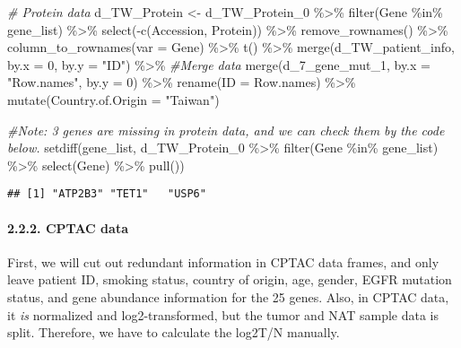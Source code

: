 \documentclass[
]{article}
\newenvironment{Shaded}{\begin{snugshade}}{\end{snugshade}}
\newcommand{\AttributeTok}[1]{\textcolor[rgb]{0.77,0.63,0.00}{#1}}
\newcommand{\CommentTok}[1]{\textcolor[rgb]{0.56,0.35,0.01}{\textit{#1}}}
\newcommand{\DecValTok}[1]{\textcolor[rgb]{0.00,0.00,0.81}{#1}}
\newcommand{\FunctionTok}[1]{\textcolor[rgb]{0.00,0.00,0.00}{#1}}
\newcommand{\NormalTok}[1]{#1}
\newcommand{\OtherTok}[1]{\textcolor[rgb]{0.56,0.35,0.01}{#1}}
\newcommand{\SpecialCharTok}[1]{\textcolor[rgb]{0.00,0.00,0.00}{#1}}
\newcommand{\StringTok}[1]{\textcolor[rgb]{0.31,0.60,0.02}{#1}}
\begin{document}
\begin{Shaded}
\begin{Highlighting}[]
\CommentTok{\# Protein data}
\NormalTok{d\_TW\_Protein }\OtherTok{\textless{}{-}}\NormalTok{ d\_TW\_Protein\_0 }\SpecialCharTok{\%\textgreater{}\%} 
  \FunctionTok{filter}\NormalTok{(Gene }\SpecialCharTok{\%in\%}\NormalTok{ gene\_list) }\SpecialCharTok{\%\textgreater{}\%} 
  \FunctionTok{select}\NormalTok{(}\SpecialCharTok{{-}}\FunctionTok{c}\NormalTok{(Accession, Protein)) }\SpecialCharTok{\%\textgreater{}\%}
  \FunctionTok{remove\_rownames}\NormalTok{() }\SpecialCharTok{\%\textgreater{}\%}
  \FunctionTok{column\_to\_rownames}\NormalTok{(}\AttributeTok{var =} \StringTok{\textquotesingle{}Gene\textquotesingle{}}\NormalTok{) }\SpecialCharTok{\%\textgreater{}\%}
  \FunctionTok{t}\NormalTok{() }\SpecialCharTok{\%\textgreater{}\%}
  \FunctionTok{merge}\NormalTok{(d\_TW\_patient\_info, }\AttributeTok{by.x =} \DecValTok{0}\NormalTok{, }\AttributeTok{by.y =} \StringTok{"ID"}\NormalTok{) }\SpecialCharTok{\%\textgreater{}\%} \CommentTok{\#Merge data}
  \FunctionTok{merge}\NormalTok{(d\_7\_gene\_mut\_1, }\AttributeTok{by.x =} \StringTok{"Row.names"}\NormalTok{, }\AttributeTok{by.y =} \DecValTok{0}\NormalTok{) }\SpecialCharTok{\%\textgreater{}\%}
  \FunctionTok{rename}\NormalTok{(}\AttributeTok{ID =}\NormalTok{ Row.names) }\SpecialCharTok{\%\textgreater{}\%}
  \FunctionTok{mutate}\NormalTok{(}\AttributeTok{Country.of.Origin =} \StringTok{"Taiwan"}\NormalTok{)}

\CommentTok{\#Note: 3 genes are missing in protein data, and we can check them by the code below.}
\FunctionTok{setdiff}\NormalTok{(gene\_list, d\_TW\_Protein\_0 }\SpecialCharTok{\%\textgreater{}\%}
          \FunctionTok{filter}\NormalTok{(Gene }\SpecialCharTok{\%in\%}\NormalTok{ gene\_list) }\SpecialCharTok{\%\textgreater{}\%} 
          \FunctionTok{select}\NormalTok{(Gene) }\SpecialCharTok{\%\textgreater{}\%} 
          \FunctionTok{pull}\NormalTok{())}
\end{Highlighting}
\end{Shaded}

\begin{verbatim}
## [1] "ATP2B3" "TET1"   "USP6"
\end{verbatim}

\hypertarget{cptac-data}{%
\paragraph{2.2.2. CPTAC data}\label{cptac-data}}

First, we will cut out redundant information in CPTAC data frames, and
only leave patient ID, smoking status, country of origin, age, gender,
EGFR mutation status, and gene abundance information for the 25 genes.
Also, in CPTAC data, it \emph{is} normalized and log2-transformed, but
the tumor and NAT sample data is split. Therefore, we have to calculate
the log2T/N manually.
\end{document}
